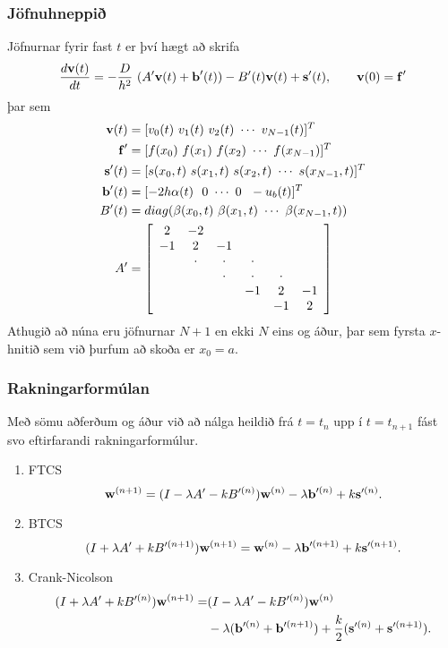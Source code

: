 \documentclass[icelandic,a4paper,12pt]{article}
\begin{document}
  \subsubsection{Jöfnuhneppið}
 Jöfnurnar fyrir fast $t$ er því hægt að skrifa
 $$ 
 \frac{d \mbox{${\bf v}$}(t)}{d t} =  -\frac{D}{h^2}\  (A'\mbox{${\bf v}$}(t) + \mbox{${\bf b}$}'(t)) 
 -B'(t)\mbox{${\bf v}$}(t) + \mbox{${\bf s}$}'(t), \qquad \mbox{${\bf v}$}(0)=\mbox{${\bf f}$}'
 $$ \pause
 þar sem 
 {\small \begin{align*}
  \vv(t) &= [v_0(t) \ v_1(t) \ v_2(t) \ \cdots \ v_{N-1}(t) ]^T\\
  \fv' &= [ f(x_0) \ f(x_1) \ f(x_2) \ \cdots \ f(x_{N-1}) ]^T\\
  \sv'(t) &= [ s(x_0,t) \ s(x_1,t) \ s(x_2,t) \ \cdots \ s(x_{N-1},t) ]^T\\
  \bv'(t) &= [ -2h\alpha(t) \ \ 0 \ \cdots \ 0 \ \ -u_b(t) ]^T \\
  B'(t) &= diag(\beta(x_0,t)\ \beta(x_1,t) \ \cdots \ \beta(x_{N-1},t) )\\
  A' &=  \left[\begin{array}{cccccc}
2 & -2 &   &   &   &  \\
-1 & 2 & -1 &   &   &  \\
  & \cdot & \cdot & \cdot &   &  \\
  &   & \cdot & \cdot & \cdot &  \\
  &   &  & -1 & 2 & -1\\
  &   &   &   & -1 & 2
      \end{array}\right] 
 \end{align*}} \pause
   Athugið að núna eru jöfnurnar $N+1$ en ekki $N$ eins og áður, þar sem fyrsta
   $x$-hnitið sem við þurfum að skoða er $x_0=a$.
  

\subsubsection{Rakningarformúlan}
Með sömu aðferðum og áður við að nálga heildið frá $t=t_n$ upp í $t=t_{n+1}$
fást svo eftirfarandi rakningarformúlur.\pause
\begin{enumerate}
\item FTCS
   $$
     \mbox{${\bf w}$}^{(n+1)} = (I-\lambda A' - kB'^{(n)})\mbox{${\bf w}$}^{(n)} 
     - \lambda \mbox{${\bf b}$}'^{(n)} + k\mbox{${\bf s}$}'^{(n)}.
    $$\pause


\item BTCS
   $$
     (I+\lambda A' + kB'^{(n+1)})\mbox{${\bf w}$}^{(n+1)} = \mbox{${\bf w}$}^{(n)} 
     - \lambda \mbox{${\bf b}$}'^{(n+1)} + k\mbox{${\bf s}$}'^{(n+1)}.
    $$\pause


\item Crank-Nicolson
   \begin{align*}
     (I+\lambda A' + kB'^{(n)})\mbox{${\bf w}$}^{(n+1)}  = &
     (I-\lambda A' - kB'^{(n)})\mbox{${\bf w}$}^{(n)}\\ 
     & - \lambda (\mbox{${\bf b}$}'^{(n)}+\mbox{${\bf b}$}'^{(n+1)}) + \frac k2(\mbox{${\bf s}$}'^{(n)}+\mbox{${\bf s}$}'^{(n+1)}).
    \end{align*}\pause
\end{enumerate}
\end{document}
